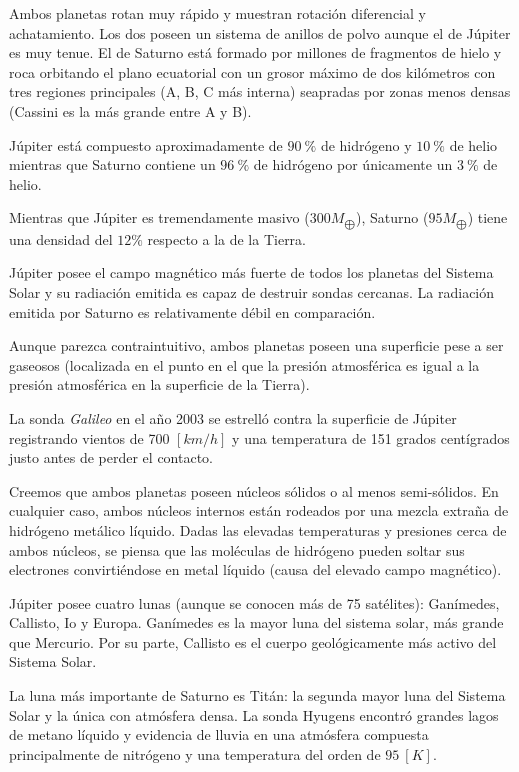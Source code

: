 \documentclass{tufte-handout}
\begin{document}
Ambos planetas rotan muy rápido y muestran rotación diferencial y achatamiento. Los dos poseen un sistema de anillos de polvo aunque el de Júpiter es muy tenue. El de Saturno está formado por millones de fragmentos de hielo y roca orbitando el plano ecuatorial con un grosor máximo de dos kilómetros con tres regiones principales (A, B, C más interna) seapradas por zonas menos densas (Cassini es la más grande entre A y B).

Júpiter está compuesto aproximadamente de $90~\%$ de hidrógeno y $10~\%$ de helio mientras que Saturno contiene un $96~\%$ de hidrógeno por únicamente un $3~\%$ de helio.

Mientras que Júpiter es tremendamente masivo ($300 M_{\bigoplus}$), Saturno ($95 M_{\bigoplus}$) tiene una densidad del $12\%$ respecto a la de la Tierra.

Júpiter posee el campo magnético más fuerte de todos los planetas del Sistema Solar y su radiación emitida es capaz de destruir sondas cercanas. La radiación emitida por Saturno es relativamente débil en comparación.

Aunque parezca contraintuitivo, ambos planetas poseen una superficie pese a ser gaseosos (localizada en el punto en el que la presión atmosférica es igual a la presión atmosférica en la superficie de la Tierra).

La sonda \emph{Galileo} en el año 2003 se estrelló contra la superficie de Júpiter registrando vientos de 700 $[km/h]$ y una temperatura de 151 grados centígrados justo antes de perder el contacto.

Creemos que ambos planetas poseen núcleos sólidos o al menos semi-sólidos. En cualquier caso, ambos núcleos internos están rodeados por una mezcla extraña de hidrógeno metálico líquido. Dadas las elevadas temperaturas y presiones cerca de ambos núcleos, se piensa que las moléculas de hidrógeno pueden soltar sus electrones convirtiéndose en metal líquido (causa del elevado campo magnético).

Júpiter posee cuatro lunas (aunque se conocen más de 75 satélites): Ganímedes, Callisto, Io y Europa. Ganímedes es la mayor luna del sistema solar, más grande que Mercurio. Por su parte, Callisto es el cuerpo geológicamente más activo del Sistema Solar.

La luna más importante de Saturno es Titán: la segunda mayor luna del Sistema Solar y la única con atmósfera densa. La sonda Hyugens encontró grandes lagos de metano líquido y evidencia de lluvia en una atmósfera compuesta principalmente de nitrógeno y una temperatura del orden de $95~[K]$.
\end{document}
